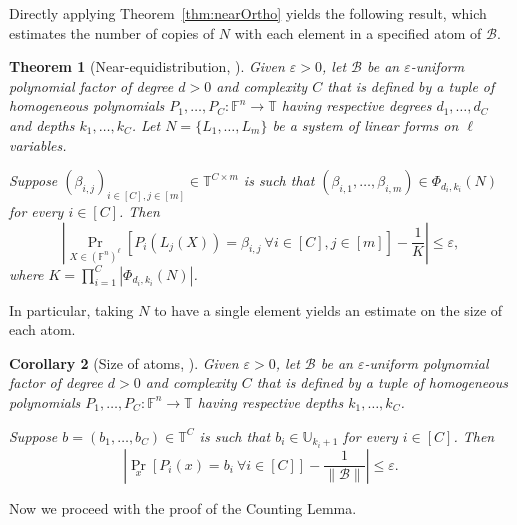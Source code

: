 \documentclass{article}
\theoremstyle{plain}
\newtheorem{theorem}{Theorem}[section]
\newtheorem{cor}[theorem]{Corollary}
\theoremstyle{definition}
\theoremstyle{definition}
\theoremstyle{remark}
\numberwithin{equation}{section}
\newcommand{\FF}{\mathbb{F}}
\newcommand{\F}{\mathbb{F}}
\newcommand{\T}{\mathbb{T}}
\newcommand{\UU}{\mathbb{U}}
\newcommand{\cB}{\mathcal B}
\begin{document}
Directly applying Theorem~\ref{thm:nearOrtho} yields the following result, which estimates the number of copies of $N$ with each element in a specified atom of $\cB$.

\begin{theorem}[Near-equidistribution, {\cite[Theorem~3.10]{hatamiRegCount}}]\label{thm:equidist}
Given $\varepsilon > 0$, let $\cB$ be an $\varepsilon$-uniform polynomial factor of
degree $d > 0$ and  complexity $C$ that is defined by a tuple of homogeneous
polynomials $P_1, \dots, P_C: \F^n
\to \T$ having respective degrees $d_1, \dots, d_C$ and
depths $k_1, \dots, k_C$.
Let $N=\{L_1,\dots,L_m\}$ be a system of linear forms on $\ell$ variables.

Suppose $(\beta_{i,j})_{i \in [C], j \in [m]} \in \T^{C \times m}$  is such that $(\beta_{i,1},\ldots,\beta_{i,m}) \in \Phi_{d_i,k_i}(N)$ for every $i \in [C]$. Then
$$
\left|\Pr_{X\in (\FF^n)^\ell}\left[P_i(L_j(X)) = \beta_{i,j}~
 \forall i \in [C],j \in [m] \right] - \frac{1}{K}\right| \leq \varepsilon,
$$
where $K= \prod_{i=1}^C |\Phi_{d_i,k_i}(N)|$.
\end{theorem}

In particular, taking $N$ to have a single element yields an estimate on the size of each atom.

\begin{cor}[Size of atoms, {\cite[Lemma~3.2]{VeryCountingMaybe}}]
\label{cor:atomSize}
Given $\varepsilon > 0$, let $\cB$ be an $\varepsilon$-uniform polynomial factor of
degree $d > 0$ and  complexity $C$ that is defined by a tuple of homogeneous
polynomials $P_1, \dots, P_C: \F^n
\to \T$ having respective
depths $k_1, \dots, k_C$.

Suppose $b=(b_1,\dots,b_C) \in \T^{C}$  is such that $b_i \in \UU_{k_i+1}$ for every $i \in [C]$. Then
$$
\left|\Pr_{x}\left[P_i(x) = b_i~
 \forall i \in [C] \right] - \frac{1}{\|\cB\|}\right| \leq \varepsilon.
$$
\end{cor}

Now we proceed with the proof of the Counting Lemma.
\end{document}
